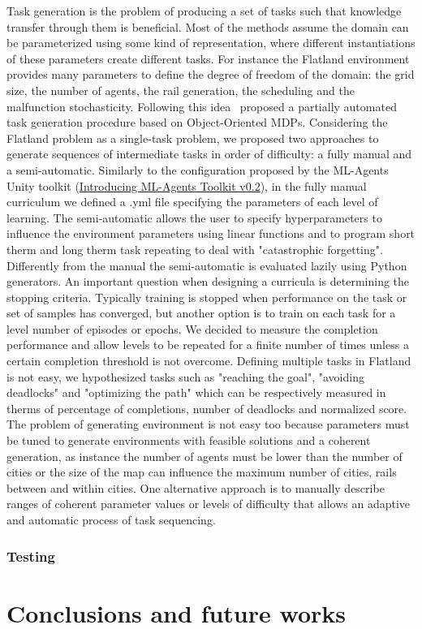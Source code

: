 \documentclass[11pt, a4paper, hidelinks]{report}
\begin{document}
Task generation is the problem of producing a set of tasks such that knowledge transfer through them is beneficial.
Most of the methods assume the domain can be parameterized using some kind of representation, where different instantiations of these parameters create different tasks.
For instance the Flatland environment provides many parameters to define the degree of freedom of the domain: the grid size, the number of agents, the rail generation, the scheduling and the malfunction stochasticity.
Following this idea~\citep{object-oriented-mdp} proposed a partially automated task generation procedure based on Object-Oriented MDPs.
Considering the Flatland problem as a single-task problem, we proposed two approaches to generate sequences of intermediate tasks in order of difficulty: a fully manual and a semi-automatic.
Similarly to the configuration proposed by the ML-Agents Unity toolkit (\href{https://blogs.unity3d.com/2017/12/08/introducing-ml-agents-v0-2-curriculum-learning-new-environments-and-more}{Introducing ML-Agents Toolkit v0.2}), in the fully manual curriculum we defined a .yml file specifying the parameters of each level of learning.
The semi-automatic allows the user to specify hyperparameters to influence the environment parameters using linear functions and to program short therm and long therm task repeating to deal with "catastrophic forgetting".
Differently from the manual the semi-automatic is evaluated lazily using Python generators.
An important question when designing a curricula is determining the stopping criteria.
Typically training is stopped when performance on the task or set of samples has converged, but another option is to train on each task for a level number of episodes or epochs.
We decided to measure the completion performance and allow levels to be repeated for a finite number of times unless a certain completion threshold is not overcome.
Defining multiple tasks in Flatland is not easy, we hypothesized tasks such as "reaching the goal", "avoiding deadlocks" and "optimizing the path" which can be respectively measured in therms of percentage of completions, number of deadlocks and normalized score.
The problem of generating environment is not easy too because parameters must be tuned to generate environments with feasible solutions and a coherent generation, as instance the number of agents must be lower than the number of cities or the size of the map can influence the maximum number of cities, rails between and within cities.
One alternative approach is to manually describe ranges of coherent parameter values or levels of difficulty that allows an adaptive and automatic process of task sequencing.

\subsection{Testing}\label{subsec:testing3}

\chapter{Conclusions and future works}

\newpage
~\nocite{*}

\end{document}
